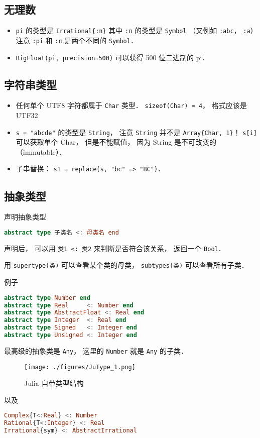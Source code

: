 \subsection{无理数}
\begin{itemize}
\item \verb|pi| 的类型是 \verb|Irrational{:π}| 其中 \verb|:π| 的类型是 \verb|Symbol| （又例如 \verb|:abc|， \verb|:a|）注意 \verb|:pi| 和 \verb|:π| 是两个不同的 \verb|Symbol|．
\item \verb|BigFloat(pi, precision=500)| 可以获得 500 位二进制的 pi．
\end{itemize}


\subsection{字符串类型}
\begin{itemize}
\item 任何单个 UTF8 字符都属于 \verb|Char| 类型． \verb|sizeof(Char) = 4|， 格式应该是 UTF32
\item \verb|s = "abcde"| 的类型是 \verb|String|， 注意 \verb|String| 并不是 \verb|Array{Char, 1}|！ \verb|s[i]| 可以获取单个 Char， 但是不能赋值， 因为 String 是不可改变的（immutable）．
\item 子串替换： \verb|s1 = replace(s, "bc" => "BC")|．
\end{itemize}


\subsection{抽象类型}
声明抽象类型
\begin{lstlisting}[language=julia]
abstract type 子类名 <: 母类名 end
\end{lstlisting}
声明后， 可以用 \verb|类1 <: 类2| 来判断是否符合该关系， 返回一个 \verb|Bool|．

用 \verb|supertype(类)| 可以查看某个类的母类， \verb|subtypes(类)| 可以查看所有子类．

例子
\begin{lstlisting}[language=julia]
abstract type Number end
abstract type Real     <: Number end
abstract type AbstractFloat <: Real end
abstract type Integer  <: Real end
abstract type Signed   <: Integer end
abstract type Unsigned <: Integer end
\end{lstlisting}
最高级的抽象类是 \verb|Any|， 这里的 \verb|Number| 就是 \verb|Any| 的子类．

\begin{figure}[ht]
\centering
\texttt{[image: ./figures/JuType\_1.png]}
\caption{Julia 自带类型结构} \label{JuType_fig1}
\end{figure}
以及
\begin{lstlisting}[language=julia]
Complex{T<:Real} <: Number
Rational{T<:Integer} <: Real
Irrational{sym} <: AbstractIrrational
\end{lstlisting}


